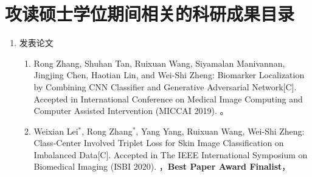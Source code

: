 \chapter{攻读硕士学位期间相关的科研成果目录}

\begin{enumerate}
	\item 发表论文
	\begin{enumerate}
		\item Rong Zhang, Shuhan Tan, Ruixuan Wang, Siyamalan Manivannan, Jingjing Chen, Haotian Lin, and Wei-Shi Zheng: Biomarker Localization by Combining CNN Classifier and Generative Adversarial Network[C]. Accepted in International Conference on Medical Image Computing and Computer Assisted Intervention (MICCAI 2019). 。
		\item Weixian Lei$^*$, Rong Zhang$^*$, Yang Yang, Ruixuan Wang, Wei-Shi Zheng: Class-Center Involved Triplet Loss  for Skin Image Classification on Imbalanced Data[C]. Accepted in The IEEE International Symposium on Biomedical Imaging (ISBI 2020). ，\textbf{Best Paper Award Finalist}，\\ 
	\end{enumerate}
	
\end{enumerate}